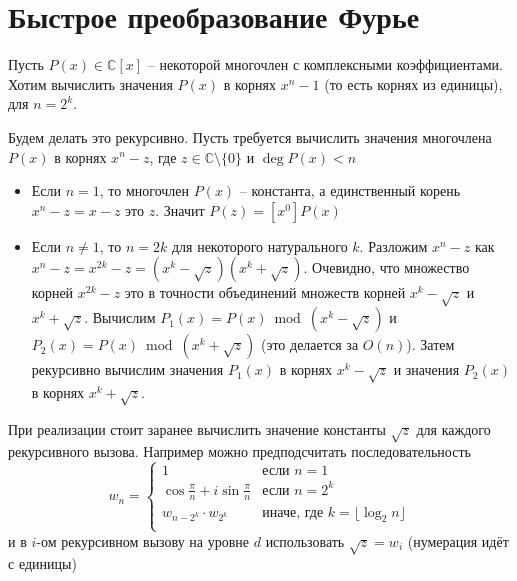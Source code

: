 \section{Быстрое преобразование Фурье}

Пусть $P(x) \in \mathbb{C}[x]$ -- некоторой многочлен с комплексными коэффициентами.
Хотим вычислить значения $P(x)$ в корнях $x^n - 1$ (то есть корнях из единицы), для $n = 2^k$.

Будем делать это рекурсивно. Пусть требуется вычислить значения многочлена $P(x)$ в корнях $x^{n} - z$, где $z \in \mathbb{C} \setminus \{0\}$ и $\deg P(x) < n$
\begin{itemize}
    \item Если $n = 1$, то многочлен $P(x)$ -- константа, а единственный корень $x^n - z = x - z$ это $z$. Значит $P(z) = [x^0]P(x)$
    \item Если $n \neq 1$, то $n = 2k$ для некоторого натурального $k$. Разложим $x^n - z$ как $x^n - z = x^{2k} - z = (x^k - \sqrt{z})(x^k + \sqrt{z})$.
          Очевидно, что множество корней $x^{2k} - z$ это в точности объединений множеств корней $x^k - \sqrt{z}$ и $x^k + \sqrt{z}$.
          Вычислим $P_1(x) = P(x) \bmod (x^k - \sqrt{z})$ и $P_2(x) = P(x) \bmod (x^k + \sqrt{z})$ (это делается за $O(n)$).
          Затем рекурсивно вычислим значения $P_1(x)$ в корнях $x^k - \sqrt{z}$ и значения $P_2(x)$ в корнях $x^k + \sqrt{z}$.
\end{itemize}

При реализации стоит заранее вычислить значение константы $\sqrt{z}$ для каждого рекурсивного вызова.
Например можно предподсчитать последовательность
$$
    w_n = \begin{cases}
        1                                         & \text{если $n = 1$}                              \\
        \cos \frac{\pi}{n} + i \sin \frac{\pi}{n} & \text{если $n = 2^k$}                            \\
        w_{n - 2^k} \cdot w_{2^k}                 & \text{иначе, где $k = \lfloor \log_2 n \rfloor$} \\
    \end{cases}
$$
и в $i$-ом рекурсивном вызову на уровне $d$ использовать $\sqrt{z} = w_i$ (нумерация идёт с единицы)